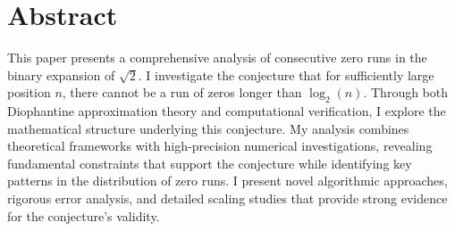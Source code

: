 
\section*{Abstract}
This paper presents a comprehensive analysis of consecutive zero runs in the binary expansion of $\sqrt{2}$. I investigate the conjecture that for sufficiently large position $n$, there cannot be a run of zeros longer than $\log_2(n)$. Through both Diophantine approximation theory and computational verification, I explore the mathematical structure underlying this conjecture. My analysis combines theoretical frameworks with high-precision numerical investigations, revealing fundamental constraints that support the conjecture while identifying key patterns in the distribution of zero runs. I present novel algorithmic approaches, rigorous error analysis, and detailed scaling studies that provide strong evidence for the conjecture’s validity.

